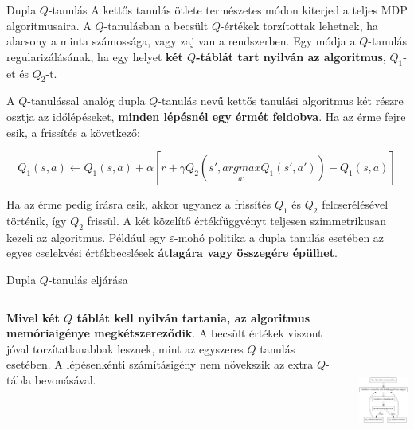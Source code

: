 \documentclass[english, aspectratio=169]{beamer}
\begin{document}
\begin{frame}{Dupla $Q$-tanulás}
A kettős tanulás ötlete természetes módon kiterjed a teljes MDP algoritmusaira. A $Q$-tanulásban a becsült $Q$-értékek torzítottak lehetnek, ha alacsony a minta számossága, vagy zaj van a rendszerben. Egy módja a $Q$-tanulás regularizálásának, ha egy helyet\textbf{ két $Q$-táblát tart nyilván az algoritmus}, $Q_1$-et és $Q_2$-t.\par\smallskip
A $Q$-tanulással analóg dupla $Q$-tanulás nevű kettős tanulási algoritmus két részre osztja az időlépéseket, \textbf{minden lépésnél egy érmét feldobva}. Ha az érme fejre esik, a frissítés a következő:
\begin{block}{}
\[
Q_1(s,a) \leftarrow Q_1(s,a) + \alpha \left[ r + \gamma Q_2 \left(s', \underset{a'}{argmax} Q_1(s',a')\right) - Q_1(s,a) \right]
\]
\end{block}
Ha az érme pedig írásra esik, akkor ugyanez a frissítés $Q_1$ és $Q_2$ felcserélésével történik, így $Q_2$ frissül. A két közelítő értékfüggvényt teljesen szimmetrikusan kezeli az algoritmus. Például egy $\varepsilon$-mohó politika a dupla tanulás esetében az egyes cselekvési értékbecslések \textbf{átlagára vagy összegére épülhet}.
\end{frame}

\begin{frame}{Dupla $Q$-tanulás eljárása}
\begin{columns}
\begin{column}{.5\textwidth}
\textbf{Mivel két $Q$ táblát kell nyilván tartania, az algoritmus memóriaigénye megkétszereződik}. A becsült értékek viszont jóval torzítatlanabbak lesznek, mint az egyszeres $Q$ tanulás esetében. A lépésenkénti számításigény nem növekszik az extra $Q$-tábla bevonásával.
\end{column}
\begin{column}{.5\textwidth}
\begin{center}
\includegraphics[height=6cm, keepaspectratio]{graphs/ql_2.png}
\end{center}
\end{column}
\end{columns}
\end{frame}
\end{document}
